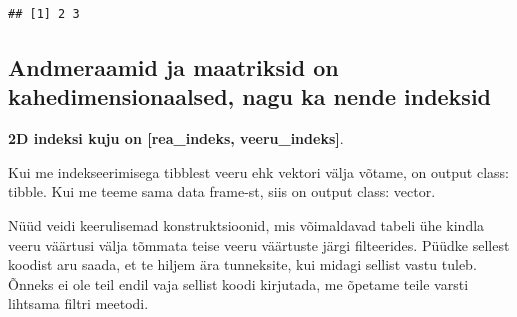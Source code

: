 \documentclass[]{book}
\newenvironment{Shaded}{\begin{snugshade}}{\end{snugshade}}
\newcommand{\KeywordTok}[1]{\textcolor[rgb]{0.13,0.29,0.53}{\textbf{#1}}}
\newcommand{\DataTypeTok}[1]{\textcolor[rgb]{0.13,0.29,0.53}{#1}}
\newcommand{\DecValTok}[1]{\textcolor[rgb]{0.00,0.00,0.81}{#1}}
\newcommand{\StringTok}[1]{\textcolor[rgb]{0.31,0.60,0.02}{#1}}
\newcommand{\CommentTok}[1]{\textcolor[rgb]{0.56,0.35,0.01}{\textit{#1}}}
\newcommand{\OperatorTok}[1]{\textcolor[rgb]{0.81,0.36,0.00}{\textbf{#1}}}
\newcommand{\NormalTok}[1]{#1}
\begin{document}
\begin{verbatim}
## [1] 2 3
\end{verbatim}

\subsection{Andmeraamid ja maatriksid on kahedimensionaalsed, nagu ka
nende
indeksid}\label{andmeraamid-ja-maatriksid-on-kahedimensionaalsed-nagu-ka-nende-indeksid}

\textbf{2D indeksi kuju on {[}rea\_indeks, veeru\_indeks{]}}.

\begin{Shaded}
\end{Shaded}

Kui me indekseerimisega tibblest veeru ehk vektori välja võtame, on
output class: tibble. Kui me teeme sama data frame-st, siis on output
class: vector.

Nüüd veidi keerulisemad konstruktsioonid, mis võimaldavad tabeli ühe
kindla veeru väärtusi välja tõmmata teise veeru väärtuste järgi
filteerides. Püüdke sellest koodist aru saada, et te hiljem ära
tunneksite, kui midagi sellist vastu tuleb. Õnneks ei ole teil endil
vaja sellist koodi kirjutada, me õpetame teile varsti lihtsama filtri
meetodi.
\end{document}
